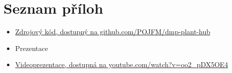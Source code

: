 \documentclass[12pt,a4paper]{article}
\begin{document}
\section{Seznam příloh}

\begin{itemize}
	\item \href{https://github.com/POJFM/dmp-plant-hub}{Zdrojový kód, dostupný na github.com/POJFM/dmp-plant-hub}
	\item Prezentace
	\item \href{https://www.youtube.com/watch?v=oo2_pDX5OE4}{Videoprezentace, dostupná na youtube.com/watch?v=oo2_pDX5OE4}
\end{itemize}
\end{document}
